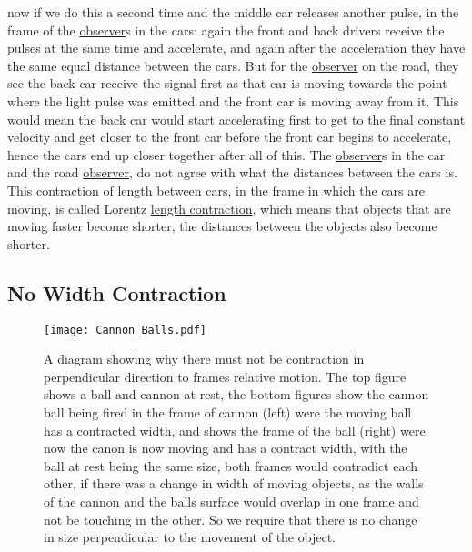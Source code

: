 now if we do this a second time and the middle car releases another pulse, in the frame of the \hyperlink{def-observer}{observer}s in the cars: again the front and back drivers receive the pulses at the same time and accelerate, and again after the acceleration they have the same equal distance between the cars. But for the \hyperlink{def-observer}{observer} on the road, they see the back car receive the signal first as that car is moving towards the point where the light pulse was emitted and the front car is moving away from it. This would mean the back car would start accelerating first to get to the final constant velocity and get closer to the front car before the front car begins to accelerate, hence the cars end up closer together after all of this. The \hyperlink{def-observer}{observer}s in the car and the road \hyperlink{def-observer}{observer}, do not agree with what the distances between the cars is. This contraction of length between cars, in the frame in which the cars are moving, is called Lorentz \hyperlink{def-length-contraction}{length contraction}, which means that objects that are moving faster become shorter, the distances between the objects also become shorter.



\subsection{No Width Contraction} \label{width contraction}

\begin{figure}[H]
\centering
       \texttt{[image: Cannon\_Balls.pdf]}
    \caption{A diagram showing why there must not be contraction in perpendicular direction to frames relative motion. The top figure shows a ball and cannon at rest, the bottom figures show the cannon ball being fired in the frame of cannon (left) were the moving ball has a contracted width, and shows the frame of the ball (right) were now the canon is now moving and has a contract width, with the ball at rest being the same size, both frames would contradict each other, if there was a change in width of moving objects, as the walls of the cannon and the balls surface would overlap in one frame and not be touching in the other. So we require that there is no change in size perpendicular to the movement of the object.}
    \label{fig: Cannonball}
\end{figure}


